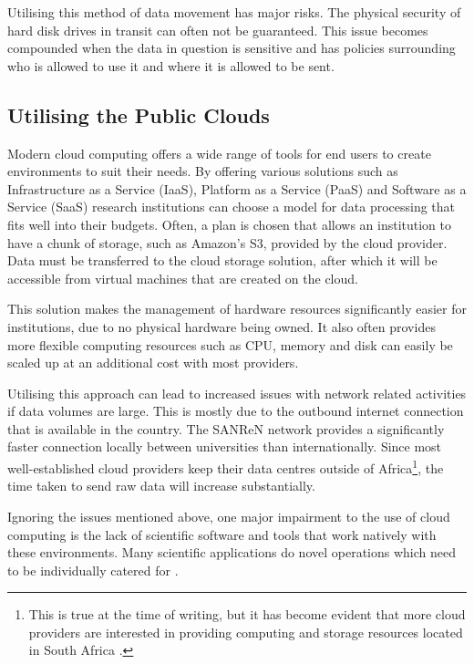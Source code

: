 Utilising this method of data movement has major risks. The physical security of hard disk drives in transit can often not be guaranteed. This issue becomes compounded when the data in question is sensitive and has policies surrounding who is allowed to use it and where it is allowed to be sent.

\subsection{Utilising the Public Clouds}

Modern cloud computing offers a wide range of tools for end users to create environments to suit their needs. By offering various solutions such as Infrastructure as a Service (IaaS), Platform as a Service (PaaS) and Software as a Service (SaaS) research institutions can choose a model for data processing that fits well into their budgets. Often, a plan is chosen that allows an institution to have a chunk of storage, such as Amazon's S3, provided by the cloud provider. Data must be transferred to the cloud storage solution, after which it will be accessible from virtual machines that are created on the cloud.

This solution makes the management of hardware resources significantly easier for institutions, due to no physical hardware being owned. It also often provides more flexible computing resources such as CPU, memory and disk can easily be scaled up at an additional cost with most providers.

Utilising this approach can lead to increased issues with network related activities if data volumes are large. This is mostly due to the outbound internet connection that is available in the country. The SANReN network provides a significantly faster connection locally between universities than internationally. Since most well-established cloud providers keep their data centres outside of Africa\footnote{This is true at the time of writing, but it has become evident that more cloud providers are interested in providing computing and storage resources located in South Africa \parencite{aws_sa,azure_sa}.}, the time taken to send raw data will increase substantially.

Ignoring the issues mentioned above, one major impairment to the use of cloud computing is the lack of scientific software and tools that work natively with these environments. Many scientific applications do novel operations which need to be individually catered for \parencite{barga2011bioinformatics}.

